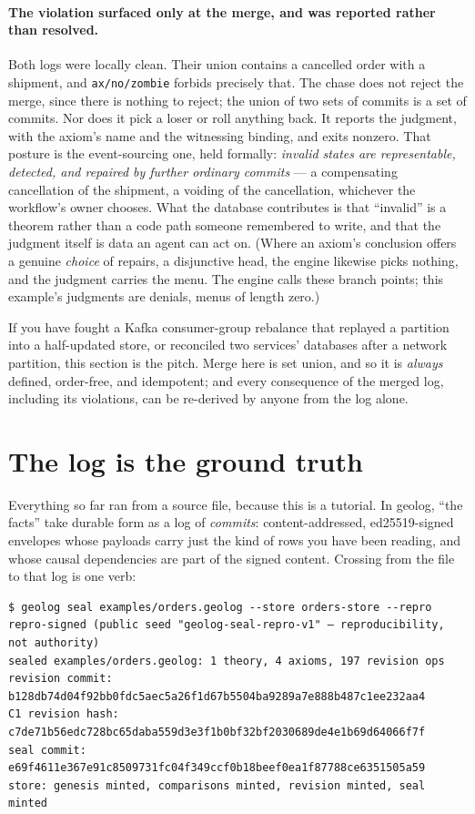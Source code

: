 \paragraph{The violation surfaced only at the merge, and was
reported rather than resolved.}
Both logs were locally clean. Their union contains a cancelled order
with a shipment, and \texttt{ax/no/zombie} forbids precisely that. The
chase does not reject the merge, since there is nothing to reject; the
union of two sets of commits is a set of commits. Nor does it pick a
loser or roll anything back. It reports the judgment, with the
axiom's name and the witnessing binding, and exits nonzero. That
posture is the event-sourcing one, held formally: \emph{invalid states
are representable, detected, and repaired by further ordinary
commits} --- a compensating cancellation of the shipment, a voiding
of the cancellation, whichever the workflow's owner chooses. What the
database contributes is that ``invalid'' is a theorem rather than a
code path someone remembered to write, and that the judgment itself
is data an agent can act on. (Where an axiom's conclusion offers a
genuine \emph{choice} of repairs, a disjunctive head, the engine
likewise picks nothing, and the judgment carries the menu. The engine
calls these branch points; this example's judgments are denials,
menus of length zero.)

If you have fought a Kafka consumer-group rebalance that replayed a
partition into a half-updated store, or reconciled two services'
databases after a network partition, this section is the pitch. Merge
here is set union, and so it is \emph{always} defined, order-free, and
idempotent; and every consequence of the merged log, including its
violations, can be re-derived by anyone from the log alone.

\section{The log is the ground truth}
\label{sec:gt-log}

Everything so far ran from a source file, because this is a tutorial.
In geolog, ``the facts'' take durable form as a log of \emph{commits}:
content-addressed, ed25519-signed envelopes whose payloads carry just
the kind of rows you have been reading, and whose causal dependencies
are part of the signed content. Crossing from the file to that log is
one verb:

\begin{Verbatim}[fontsize=\small,frame=leftline,rulecolor=\color{accentmid},framesep=3mm,xleftmargin=3mm]
$ geolog seal examples/orders.geolog --store orders-store --repro
repro-signed (public seed "geolog-seal-repro-v1" — reproducibility, not authority)
sealed examples/orders.geolog: 1 theory, 4 axioms, 197 revision ops
revision commit:  b128db74d04f92bb0fdc5aec5a26f1d67b5504ba9289a7e888b487c1ee232aa4
C1 revision hash: c7de71b56edc728bc65daba559d3e3f1b0bf32bf2030689de4e1b69d64066f7f
seal commit:      e69f4611e367e91c8509731fc04f349ccf0b18beef0ea1f87788ce6351505a59
store: genesis minted, comparisons minted, revision minted, seal minted
\end{Verbatim}

